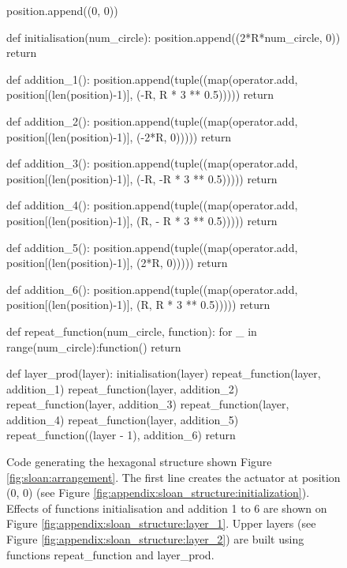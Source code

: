 \begin{figure}[h]
\begin{center}
	\scriptsize{
	\begin{python}
position.append((0, 0))

def initialisation(num_circle):
    position.append((2*R*num_circle, 0))
    return

def addition_1():
    position.append(tuple((map(operator.add, position[(len(position)-1)], (-R, R * 3 ** 0.5)))))
    return

def addition_2():
    position.append(tuple((map(operator.add, position[(len(position)-1)], (-2*R, 0)))))
    return

def addition_3():
    position.append(tuple((map(operator.add, position[(len(position)-1)], (-R, -R * 3 ** 0.5)))))
    return

def addition_4():
    position.append(tuple((map(operator.add, position[(len(position)-1)], (R, - R * 3 ** 0.5)))))
    return

def addition_5():
    position.append(tuple((map(operator.add, position[(len(position)-1)], (2*R, 0)))))
    return

def addition_6():
    position.append(tuple((map(operator.add, position[(len(position)-1)], (R, R * 3 ** 0.5)))))
    return

def repeat_function(num_circle, function):
    for _ in range(num_circle):function()
    return

def layer_prod(layer):
    initialisation(layer)
    repeat_function(layer, addition_1)
    repeat_function(layer, addition_2)
    repeat_function(layer, addition_3)
    repeat_function(layer, addition_4)
    repeat_function(layer, addition_5)
    repeat_function((layer - 1), addition_6)
    return
	\end{python}
	}
	\caption{Code generating the hexagonal structure shown Figure \ref{fig:sloan:arrangement}. The first line creates the actuator at position (0, 0) (see Figure \ref{fig:appendix:sloan_structure:initialization}). Effects of functions initialisation and addition 1 to 6 are shown on Figure \ref{fig:appendix:sloan_structure:layer_1}. Upper layers (see Figure \ref{fig:appendix:sloan_structure:layer_2}) are built using functions repeat_function and layer_prod.}
	\label{fig:appendix:sloan_structure:code}
\end{center}
\end{figure}

